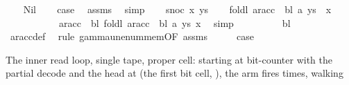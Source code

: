 \begin{isabellebody}
\ \ \isamarkupfalse%
\ Nil\isanewline
\ \ \isamarkupfalse%
\ {\isacharquery}{\kern0pt}case\ \isamarkupfalse%
\ assms{\isacharparenleft}{\kern0pt}{}{\isacharparenright}{\kern0pt}\ \isamarkupfalse%
\ simp\isanewline
{}\isamarkupfalse%
\isanewline
\ \ \isamarkupfalse%
\ {\isacharparenleft}{\kern0pt}snoc\ x\ ys{\isacharparenright}{\kern0pt}\isanewline
\ \ \isamarkupfalse%
\ {\isachardoublequoteopen}foldl\ {\isacharparenleft}{\kern0pt}ar{\isacharunderscore}{\kern0pt}acc\ {\isasymGamma}\ bl{\isacharparenright}{\kern0pt}\ a\ {\isacharparenleft}{\kern0pt}ys\ {\isacharat}{\kern0pt}\ {\isacharbrackleft}{\kern0pt}x{\isacharbrackright}{\kern0pt}{\isacharparenright}{\kern0pt}\isanewline
\ \ \ \ \ \ \ \ \ \ {\isacharequal}{\kern0pt}\ ar{\isacharunderscore}{\kern0pt}acc\ {\isasymGamma}\ bl\ {\isacharparenleft}{\kern0pt}foldl\ {\isacharparenleft}{\kern0pt}ar{\isacharunderscore}{\kern0pt}acc\ {\isasymGamma}\ bl{\isacharparenright}{\kern0pt}\ a\ ys{\isacharparenright}{\kern0pt}\ x{\isachardoublequoteclose}\ \isamarkupfalse%
\ simp\isanewline
\ \ \isamarkupfalse%
\ \isamarkupfalse%
\ {\isachardoublequoteopen}{\isasymdots}\ {\isasymin}\ {\isasymGamma}\ {\isasymunion}\ {\isacharbraceleft}{\kern0pt}bl{\isacharbraceright}{\kern0pt}{\isachardoublequoteclose}\isanewline
\ \ \ \ \isamarkupfalse%
\ ar{\isacharunderscore}{\kern0pt}acc{\isacharunderscore}{\kern0pt}def\ \isamarkupfalse%
\ {\isacharparenleft}{\kern0pt}rule\ gamma{\isacharunderscore}{\kern0pt}unenum{\isacharunderscore}{\kern0pt}mem{\isacharbrackleft}{\kern0pt}OF\ assms{\isacharparenleft}{\kern0pt}{}{\isacharparenright}{\kern0pt}{\isacharbrackright}{\kern0pt}{\isacharparenright}{\kern0pt}\isanewline
\ \ \isamarkupfalse%
\ \isamarkupfalse%
\ {\isacharquery}{\kern0pt}case\ \isakeywordONE{{\isachardot}{\kern0pt}}\isamarkupfalse%
\isanewline
{}\isamarkupfalse%
%
\endisatagproof
{\isafoldproof}%
%
\isadelimproof
%
\endisadelimproof
%
\begin{isamarkuptext}%
The inner read loop, single tape, proper cell: starting at
  bit-counter  with the partial decode  and the
  head at  (the first bit cell, ), the
   arm fires  times, walking

\end{isamarkuptext}
\end{isabellebody}
